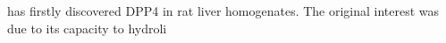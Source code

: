 \citet{Hopsu-Havu1966} has firstly discovered DPP4 in rat liver homogenates. The original interest was due to its capacity to hydroli